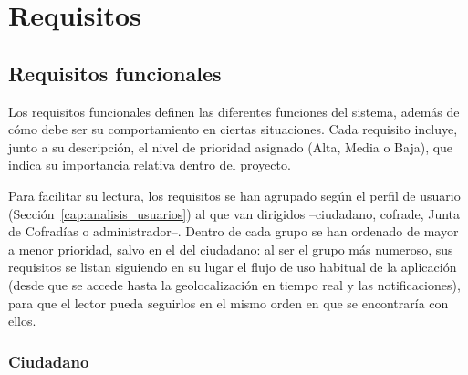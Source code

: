\section{Requisitos}
\label{cap:requisitos}

\newcommand{\prioridad}[1]{\textit{(Prioridad: #1)}}

\subsection{Requisitos funcionales}

Los requisitos funcionales definen las diferentes funciones del sistema, además de cómo debe ser su comportamiento en ciertas situaciones. Cada requisito incluye, junto a su descripción, el nivel de prioridad asignado (Alta, Media o Baja), que indica su importancia relativa dentro del proyecto.

Para facilitar su lectura, los requisitos se han agrupado según el perfil de usuario (Sección~\ref{cap:analisis_usuarios}) al que van dirigidos --ciudadano, cofrade, Junta de Cofradías o administrador--. Dentro de cada grupo se han ordenado de mayor a menor prioridad, salvo en el del ciudadano: al ser el grupo más numeroso, sus requisitos se listan siguiendo en su lugar el flujo de uso habitual de la aplicación (desde que se accede hasta la geolocalización en tiempo real y las notificaciones), para que el lector pueda seguirlos en el mismo orden en que se encontraría con ellos.

\subsubsection{Ciudadano}

